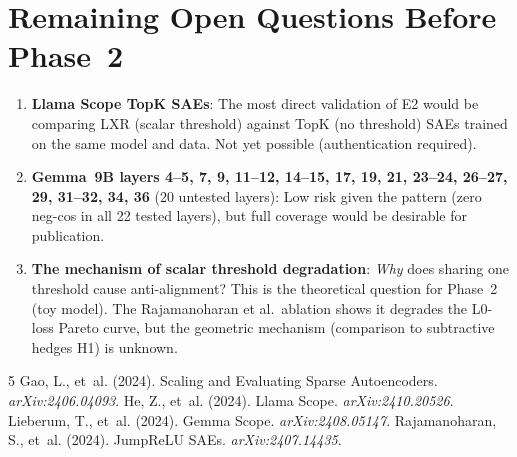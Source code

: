 \documentclass[11pt,a4paper]{article}
\begin{document}
\section{Remaining Open Questions Before Phase~2}

\begin{enumerate}
  \item \textbf{Llama Scope TopK SAEs}: The most direct validation of E2 would be comparing LXR (scalar threshold) against TopK (no threshold) SAEs trained on the same model and data. Not yet possible (authentication required).

  \item \textbf{Gemma~9B layers 4--5, 7, 9, 11--12, 14--15, 17, 19, 21, 23--24, 26--27, 29, 31--32, 34, 36} (20 untested layers): Low risk given the pattern (zero neg-cos in all 22 tested layers), but full coverage would be desirable for publication.

  \item \textbf{The mechanism of scalar threshold degradation}: \emph{Why} does sharing one threshold cause anti-alignment? This is the theoretical question for Phase~2 (toy model). The Rajamanoharan et al.\ ablation shows it degrades the L0-loss Pareto curve, but the geometric mechanism (comparison to subtractive hedges H1) is unknown.
\end{enumerate}


\begin{thebibliography}{5}
 Gao, L., et~al. (2024). Scaling and Evaluating Sparse Autoencoders. \emph{arXiv:2406.04093}.
 He, Z., et~al. (2024). Llama Scope. \emph{arXiv:2410.20526}.
 Lieberum, T., et~al. (2024). Gemma Scope. \emph{arXiv:2408.05147}.
 Rajamanoharan, S., et~al. (2024). JumpReLU SAEs. \emph{arXiv:2407.14435}.
\end{thebibliography}
\end{document}
